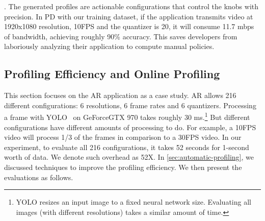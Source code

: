 . The generated profiles are actionable
configurations that control the knobs with precision. In PD with our training
dataset, if the application transmits video at 1920x1080 resolution, 10FPS and
the quantizer is 20, it will consume 11.7 mbps of bandwidth, achieving roughly
90\% accuracy. This saves developers from laboriously analyzing their
application to compute manual policies.

\subsection{Profiling Efficiency and Online Profiling}
\label{sec:online-profiling}

This section focuses on the AR application as a case study. AR allows 216
different configurations: 6 resolutions, 6 frame rates and 6
quantizers. Processing a frame with YOLO~\cite{redmon2016yolo9000} on
GeForce\textregistered\space GTX 970 takes roughly 30 ms.\footnote{YOLO resizes
  an input image to a fixed neural network size. Evaluating all images (with
  different resolutions) takes a similar amount of time.} But different
configurations have different amounts of processing to do. For example, a 10FPS
video will process 1/3 of the frames in comparison to a 30FPS video. In our
experiment, to evaluate all 216 configurations, it takes 52 seconds for 1-second
worth of data. We denote such overhead as 52X. In
\autoref{sec:automatic-profiling}, we discussed techniques to improve the
profiling efficiency. We then present the evaluations as follows.

